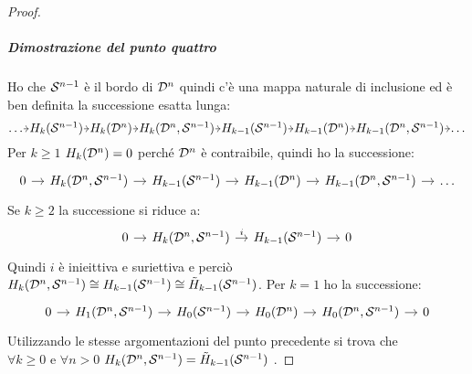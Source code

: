 \begin{proof}
  \subparagraph{Dimostrazione del punto quattro}

  Ho che $ \mathcal{S}^{n-1} $ è il bordo di $ \mathcal{D}^{n} $ quindi c'è una mappa naturale di inclusione
  ed è ben definita la successione esatta lunga:
  \[
    \begin{tikzcd}[nodes={column sep=4.5pt, inner sep=0.5pt}]
      \dots \rar & H_k(\Sph{n-1}) \rar & H_k(\Disk{n}) \rar & H_k(\Disk{n}, \Sph{n-1}) \rar
      & H_{k-1}(\Sph{n-1}) \rar & H_{k-1}(\Disk{n}) \rar & H_{k-1}(\Disk{n}, \Sph{n-1}) \rar & \dots
    \end{tikzcd}
  \]
  Per $ k \geq 1 $ $ H_k(\mathcal{D}^{n}) = 0 $ perché $ \mathcal{D}^{n} $ è contraibile, quindi ho la successione:
  \[
    \begin{tikzcd}[nodes={column sep=10pt}]
      0 \rar & H_k(\Disk{n}, \Sph{n-1}) \rar & H_{k-1}(\Sph{n-1}) \rar & H_{k-1}(\Disk{n}) \rar & H_{k-1}(\Disk{n}, \Sph{n-1}) \rar & \dots
    \end{tikzcd}
  \]
  Se $ k \geq 2 $ la successione si riduce a:
  \[
    \begin{tikzcd}[nodes={column sep=10pt}]
      0 \rar & H_k(\Disk{n}, \Sph{n-1}) \rar{i} & H_{k-1}(\Sph{n-1}) \rar & 0
    \end{tikzcd}
  \]
  Quindi $ i $ è inieittiva e suriettiva e perciò
  $ H_k(\mathcal{D}^{n}, \mathcal{S}^{n-1}) \cong H_{k-1}(\mathcal{S}^{n-1}) \cong \tilde{H}_{k-1}(\mathcal{S}^{n-1}) $.
  Per $ k = 1 $ ho la successione:
  \[
    \begin{tikzcd}[nodes={column sep=10pt}]
      0 \rar & H_1(\Disk{n}, \Sph{n-1}) \rar & H_0(\Sph{n-1}) \rar & H_0(\Disk{n}) \rar & H_0(\Disk{n}, \Sph{n-1}) \rar & 0
    \end{tikzcd}
  \]
  Utilizzando  le stesse argomentazioni del punto precedente si trova che
  $ \forall k \geq 0 \text{ e } \forall n > 0 $ $ H_k(\mathcal{D}^{n}, \mathcal{S}^{n-1}) = \tilde{H}_{k-1}(\mathcal{S}^{n-1}) $ .


\end{proof}
